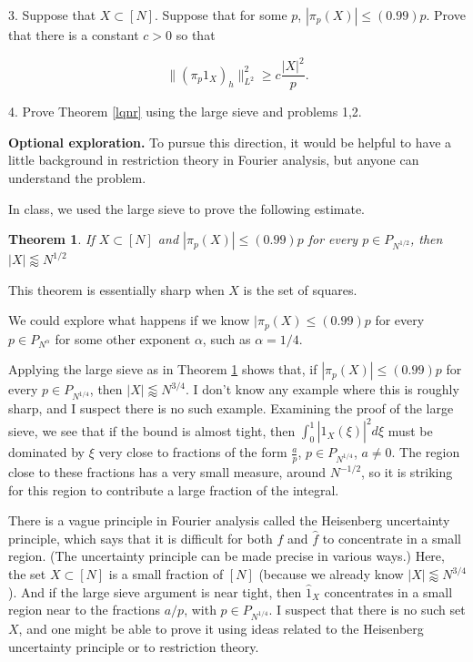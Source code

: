 \documentclass{amsart}
\newtheorem{theorem}{Theorem}
\begin{document}
3.  Suppose that $X \subset [N]$.   Suppose that for some $p$,  $| \pi_p(X) | \le (0.99) p$.   Prove that there is a constant $c > 0$ so that 

$$ \| ( \pi_p 1_X)_h \|_{L^2}^2 \ge c \frac{|X|^2}{p}. $$

\vskip10pt

4.  Prove Theorem \ref{lqnr} using the large sieve and problems 1,2.

\vskip50pt

{\bf Optional exploration.} To pursue this direction,  it would be helpful to have a little background in restriction theory in Fourier analysis,  but anyone can understand the problem.

In class,  we used the large sieve to prove the following estimate.

\begin{theorem} \label{proj1} If $X \subset [N]$ and $| \pi_p(X) | \le (0.99) p$ for every $p \in P_{N^{1/2}}$,  then $|X| \lessapprox N^{1/2}$
\end{theorem}

This theorem is essentially sharp when $X$ is the set of squares. 

We could explore what happens if we know $| \pi_p(X) \le (0.99) p$ for every $p \in P_{N^\alpha}$ for some other exponent $\alpha$,  such as $\alpha = 1/4$.

Applying the large sieve as in Theorem \ref{proj1} shows that, if $|\pi_p(X)| \le (0.99)p$ for every $p \in P_{N^{1/4}}$, then $|X| \lessapprox N^{3/4}$.   I don't know any example where this is roughly sharp,  and I suspect there is no such example.   Examining the proof of the large sieve,  we see that if the bound is almost tight,  then $\int_0^1 | \hat 1_X(\xi)|^2 d \xi$ must be dominated by $\xi$ very close to fractions of the form $\frac{a}{p}$,  $p \in P_{N^{1/4}}$,  $a \not= 0$.   The region close to these fractions has a very small measure,  around $N^{-1/2}$,  so it is striking for this region to contribute a large fraction of the integral. 

There is a vague principle in Fourier analysis called the Heisenberg uncertainty principle,  which says that it is difficult for both $f$ and $\hat f$ to concentrate in a small region.   (The uncertainty principle can be made precise in various ways.)   Here,  the set $X \subset [N]$ is a small fraction of $[N]$ (because we already know $|X| \lessapprox N^{3/4}$).   And if the large sieve argument is near tight,  then $\hat 1_X$ concentrates in a small region near to the fractions $a/p$,  with $p \in P_{N^{1/4}}$.   I suspect that there is no such set $X$,  and one might be able to prove it using ideas related to the Heisenberg uncertainty principle or to restriction theory.
\end{document}
